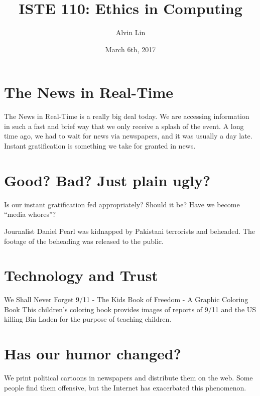 \documentclass[letterpaper, 12pt]{article}
\title{ISTE 110: Ethics in Computing}
\author{Alvin Lin}
\date{March 6th, 2017}
\begin{document}
\maketitle

\section*{The News in Real-Time}
The News in Real-Time is a really big deal today. We are accessing information
in such a fast and brief way that we only receive a splash of the event.
A long time ago, we had to wait for news via newspapers, and it was usually
a day late. Instant gratification is something we take for granted in news.

\section*{Good? Bad? Just plain ugly?}
Is our instant gratification fed appropriately? Should it be? Have we become
``media whores''? \par
Journalist Daniel Pearl was kidnapped by Pakistani terrorists and beheaded. The
footage of the beheading was released to the public.

\section*{Technology and Trust}
We Shall Never Forget 9/11 - The Kids Book of Freedom - A Graphic Coloring Book
This children's coloring book provides images of reports of 9/11 and the US
killing Bin Laden for the purpose of teaching children.

\section*{Has our humor changed?}
We print political cartoons in newspapers and distribute them on the web. Some
people find them offensive, but the Internet has exacerbated this phenomenon.
\end{document}
